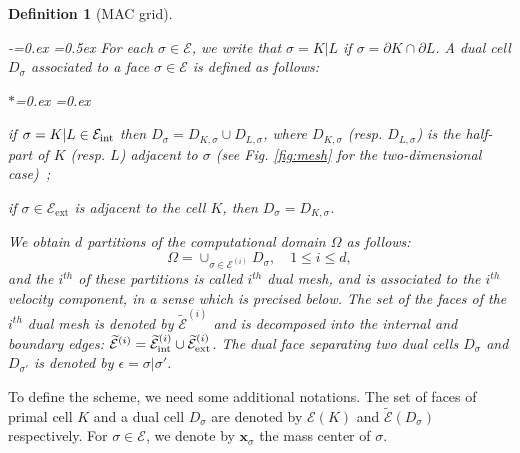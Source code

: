 \documentclass{amsart}
\newtheorem{df}{Definition}
\numberwithin{equation}{section}
\begin{document}
\begin{df}[MAC grid]
\begin{list}{-}{\itemsep=0.ex \topsep=0.5ex    }
\medskip
For each ${{\sigma}}\in{{\mathcal E}}$, we write that ${{\sigma}} = K \vert L$ if ${{\sigma}} = \partial K \cap \partial L$.
A dual cell $D_{{\sigma}}$ associated to a face ${{\sigma}} \in{{\mathcal E}}$ is defined as follows:  
\begin{list}{$\ast$}{\itemsep=0.ex \topsep=0.ex     }
\item if ${{\sigma}}=K|L \in {{\mathcal E}_{\rm int}}$ then  $D_{{\sigma}} = D_{ K,{{\sigma}}}\cup D_{ L,{{\sigma}}}$, where $D_{ K,{{\sigma}}}$ 
(resp. $D_{ L,{{\sigma}}}$) is the half-part of $K$ (resp. $L$) adjacent to ${{\sigma}}$ (see Fig. \ref{fig:mesh} for the two-dimensional case)~; 
\item if ${{\sigma}} \in {{\mathcal E}_{\mathrm{ext}}}$ is adjacent to the cell $K$, then $D_{{\sigma}}=D_{ K,{{\sigma}}}$.
\end{list}
We obtain $d$ partitions of the computational domain $\Omega$ as follows:
\[
\Omega = \cup_{{{\sigma}} \in {\mathcal {E}^{(i)}}} D_{{\sigma}},\quad 1 \leq i \leq d,
\]
and the $i^{th}$ of these partitions is called $i^{th}$ dual mesh, and is associated to the $i^{th}$ velocity component, in a sense which is precised below.
The set of the faces of the $i^{th}$ dual mesh is denoted by ${{{\widetilde {{\mathcal E}}}^{(i)}}}$ and is decomposed into the internal and boundary edges: ${{{\widetilde {{\mathcal E}}}^{(i)}}} = {{{\widetilde {{\mathcal E}}}^{(i)}_{{\rm int}}}}\cup {{{\widetilde {{\mathcal E}}}^{(i)}_{{\rm ext}}}}$.
The dual face separating two dual cells $D_{{\sigma}}$ and $D_{{{\sigma}}'}$ is denoted by ${\epsilon}={{\sigma}}|{{\sigma}}'$.
\end{list}
\end{df}

\medskip
To define the scheme, we need some additional notations.
The set of faces of primal cell $K$ and a dual cell $D_{{\sigma}}$ are denoted by ${{{\mathcal E}}(K)}$ and ${\widetilde {{\mathcal E}}}(D_{{\sigma}})$ respectively.
For ${{\sigma}} \in {{\mathcal E}}$, we denote by ${{\boldsymbol x}}_{{\sigma}}$ the mass center of ${{\sigma}}$.
\end{document}
